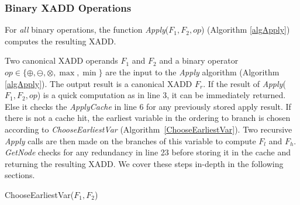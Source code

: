 \documentclass[twoside,11pt]{article}
\begin{document}
\subsubsection{Binary XADD Operations}

For \emph{all} binary operations, the function \emph{Apply}($F_1,F_2,\mathit{op}$) (Algorithm \ref{algApply}) computes the resulting XADD. 

Two canonical XADD operands $F_1$ and $F_2$ and a binary operator $\mathit{op} \in \{ \oplus, \ominus, \otimes , \max , \min \} $ are the input to the \emph{Apply} algorithm (Algorithm \ref{algApply}). The output result is a canonical XADD $F_r$. 
If the result of \emph{Apply}($F_1,F_2,\mathit{op}$) is a quick computation as in line 3, 
it can be immediately returned. Else it checks the \emph{ApplyCache} in line 6 for any previously stored apply result.  If there is not a cache hit, the earliest variable in the ordering to branch is chosen according to \emph{ChooseEarliestVar}
(Algorithm~\ref{ChooseEarliestVar}). Two recursive \emph{Apply} calls are then made on the branches of this variable to compute $F_l$ and $F_h$. \emph{GetNode} checks for any redundancy in line 23 before storing it in the cache and returning the resulting XADD. We cover these steps in-depth in the following sections.

\begin{algorithm}[t!]

\caption{{\sc ChooseEarliestVar}($F_1,F_2$)  \label{algChooseVarBranch}}
\end{algorithm}
\end{document}
